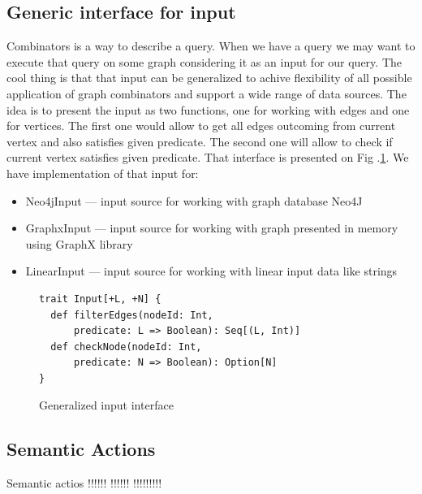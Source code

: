\subsection{Generic interface for input}
Combinators is a way to describe a query. When we have a query we may want to execute that query on some graph considering it as an input for our query. The cool thing is that that input can be generalized to achive flexibility of all possible application of graph combinators and support a wide range of data sources. The idea is to present the input as two functions, one for working with edges and one for vertices. The first one would allow to get all edges outcoming from current vertex and also satisfies given predicate. The second one will allow to check if current vertex satisfies given predicate. That interface is presented on Fig .\ref{fig:input}. We have implementation of that input for: 

\begin{itemize}
    \item Neo4jInput --- input source for working with graph database Neo4J
    \item GraphxInput --- input source for working with graph presented in memory using GraphX library
    \item LinearInput --- input source for working with linear input data like strings
\end{itemize}
\begin{figure}[h]
\begin{lstlisting}
trait Input[+L, +N] {
  def filterEdges(nodeId: Int, 
      predicate: L => Boolean): Seq[(L, Int)]
  def checkNode(nodeId: Int, 
      predicate: N => Boolean): Option[N]
}

\end{lstlisting}
\caption{Generalized input interface}
\label{fig:input}
\end{figure}


\subsection{Semantic Actions}
\label{sec:semanticActions}

Semantic actios !!!!!!
!!!!!!
!!!!!!!!!